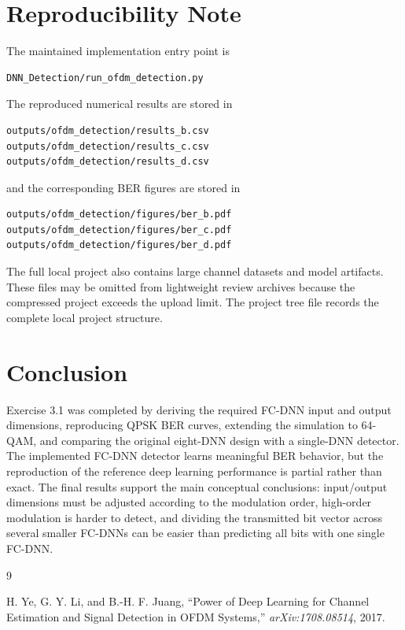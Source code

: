 \documentclass[11pt,a4paper]{article}
\begin{document}
\section{Reproducibility Note}

The maintained implementation entry point is
\begin{verbatim}
DNN_Detection/run_ofdm_detection.py
\end{verbatim}
The reproduced numerical results are stored in
\begin{verbatim}
outputs/ofdm_detection/results_b.csv
outputs/ofdm_detection/results_c.csv
outputs/ofdm_detection/results_d.csv
\end{verbatim}
and the corresponding BER figures are stored in
\begin{verbatim}
outputs/ofdm_detection/figures/ber_b.pdf
outputs/ofdm_detection/figures/ber_c.pdf
outputs/ofdm_detection/figures/ber_d.pdf
\end{verbatim}

The full local project also contains large channel datasets and model artifacts. These files may be omitted from lightweight review archives because the compressed project exceeds the upload limit. The project tree file records the complete local project structure.

\section{Conclusion}

Exercise 3.1 was completed by deriving the required FC-DNN input and output dimensions, reproducing QPSK BER curves, extending the simulation to 64-QAM, and comparing the original eight-DNN design with a single-DNN detector. The implemented FC-DNN detector learns meaningful BER behavior, but the reproduction of the reference deep learning performance is partial rather than exact. The final results support the main conceptual conclusions: input/output dimensions must be adjusted according to the modulation order, high-order modulation is harder to detect, and dividing the transmitted bit vector across several smaller FC-DNNs can be easier than predicting all bits with one single FC-DNN.

\begin{thebibliography}{9}

H. Ye, G. Y. Li, and B.-H. F. Juang,
``Power of Deep Learning for Channel Estimation and Signal Detection in OFDM Systems,''
\emph{arXiv:1708.08514}, 2017.

\end{thebibliography}
\end{document}
